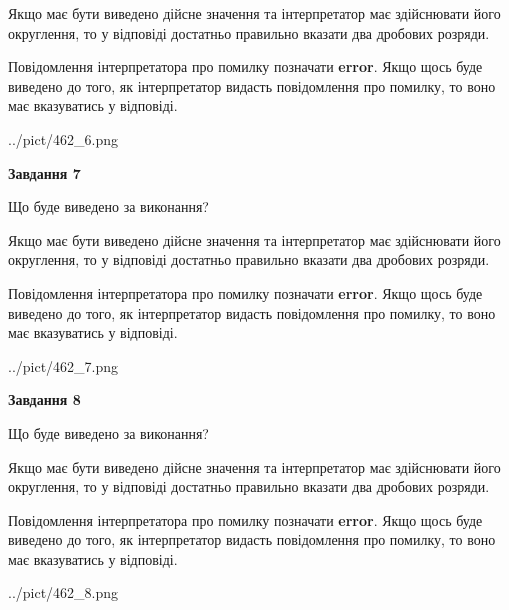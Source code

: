 \documentclass[12pt, ukrainian]{article}
\begin{document}
{\begin {Large}
Якщо має бути виведено дійсне значення та інтерпретатор має здійснювати його округлення, 
то у відповіді достатньо правильно вказати два дробових розряди.

Повідомлення інтерпретатора про помилку позначати \textbf{error}.
Якщо щось буде виведено до того, як інтерпретатор видасть повідомлення про помилку, 
то воно має вказуватись у відповіді. \par

\begin{center}
	{../pict/462_6.png}
\end{center}
\newpage

{\begin {center}\textbf{Завдання 7}\end {center}}\par
Що буде виведено за виконання? \par

Якщо має бути виведено дійсне значення та інтерпретатор має здійснювати його округлення, 
то у відповіді достатньо правильно вказати два дробових розряди.

Повідомлення інтерпретатора про помилку позначати \textbf{error}.
Якщо щось буде виведено до того, як інтерпретатор видасть повідомлення про помилку, 
то воно має вказуватись у відповіді. \par

\begin{center}
	{../pict/462_7.png}
\end{center}
\newpage

{\begin {center}\textbf{Завдання 8}\end {center}}\par
Що буде виведено за виконання? \par

Якщо має бути виведено дійсне значення та інтерпретатор має здійснювати його округлення, 
то у відповіді достатньо правильно вказати два дробових розряди.

Повідомлення інтерпретатора про помилку позначати \textbf{error}.
Якщо щось буде виведено до того, як інтерпретатор видасть повідомлення про помилку, 
то воно має вказуватись у відповіді. \par

\begin{center}
	{../pict/462_8.png}
\end{center}
\newpage


\end{Large}}
\end{document}
